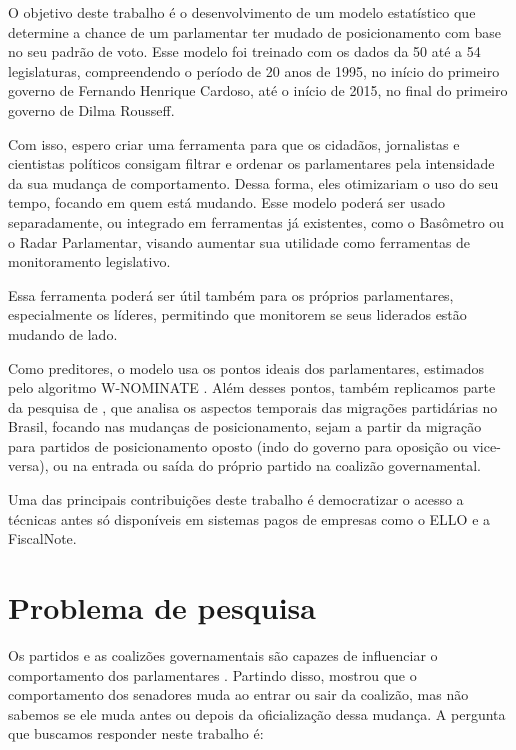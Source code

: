 O objetivo deste trabalho é o desenvolvimento de um modelo estatístico que
determine a chance de um parlamentar ter mudado de posicionamento com base no
seu padrão de voto. Esse modelo foi treinado com os dados da
50\textordfeminine{} até a 54\textordfeminine{} legislaturas, compreendendo o
período de 20 anos de 1995, no início do primeiro governo de Fernando Henrique
Cardoso, até o início de 2015, no final do primeiro governo de Dilma Rousseff.

Com isso, espero criar uma ferramenta para que os cidadãos, jornalistas e
cientistas políticos consigam filtrar e ordenar os parlamentares pela
intensidade da sua mudança de comportamento. Dessa forma, eles otimizariam o
uso do seu tempo, focando em quem está mudando. Esse modelo poderá ser usado
separadamente, ou integrado em ferramentas já existentes, como o Basômetro ou o
Radar Parlamentar, visando aumentar sua utilidade como ferramentas de
monitoramento legislativo.

Essa ferramenta poderá ser útil também para os próprios parlamentares,
especialmente os líderes, permitindo que monitorem se seus liderados estão
mudando de lado.

Como preditores, o modelo usa os pontos ideais dos parlamentares, estimados
pelo algoritmo W-NOMINATE \cite{Poole1985,Poole2005}. Além desses pontos,
também replicamos parte da pesquisa de , que analisa os
aspectos temporais das migrações partidárias no Brasil, focando nas mudanças de
posicionamento, sejam a partir da migração para partidos de posicionamento
oposto (indo do governo para oposição ou vice-versa), ou na entrada ou saída do
próprio partido na coalizão governamental.

Uma das principais contribuições deste trabalho é democratizar o acesso a
técnicas antes só disponíveis em sistemas pagos de empresas como o \gls{ELLO}
e a FiscalNote.

\section{Problema de pesquisa}
\label{cap:introducao:problemas-de-pesquisa}

Os partidos e as coalizões governamentais são capazes de influenciar o
comportamento dos parlamentares \cite{Figueiredo2001,Santos2003}. Partindo
disso,  mostrou que o comportamento dos senadores muda ao
entrar ou sair da coalizão, mas não sabemos se ele muda antes ou depois da
oficialização dessa mudança. A pergunta que buscamos responder neste trabalho
é:

